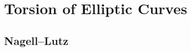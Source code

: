 \documentclass[../notes.tex]{subfiles}
\begin{document}
\section{Torsion of Elliptic Curves}

\subsection{Nagell--Lutz}
\end{document}
